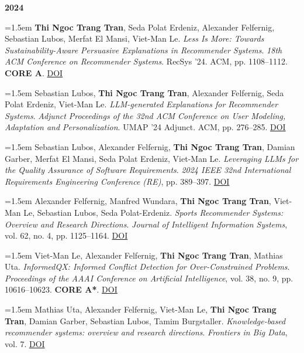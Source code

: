 \documentclass[11pt,a4paper]{article}
\newcommand{\pub}[1]{%
  \par\noindent\hangindent=1.5em\hangafter=1 #1\par\vspace{0.5ex}}
\newcommand{\pubyear}[1]{\vspace{0.7ex}\par\noindent\textbf{#1}\par\vspace{0.2ex}}
\begin{document}
\pubyear{2024}
\pub{\textbf{Thi Ngoc Trang Tran}, Seda Polat Erdeniz, Alexander Felfernig, Sebastian Lubos, Merfat El Mansi, Viet-Man Le. \textit{Less Is More: Towards Sustainability-Aware Persuasive Explanations in Recommender Systems}. \textit{18th ACM Conference on Recommender Systems}. RecSys ’24. ACM, pp. 1108–1112. \textbf{CORE A}. \href{https://doi.org/10.1145/3640457.3691708}{DOI}}
\pub{Sebastian Lubos, \textbf{Thi Ngoc Trang Tran}, Alexander Felfernig, Seda Polat Erdeniz, Viet-Man Le. \textit{LLM-generated Explanations for Recommender Systems}. \textit{Adjunct Proceedings of the 32nd ACM Conference on User Modeling, Adaptation and Personalization}. UMAP ’24 Adjunct. ACM, pp. 276–285. \href{https://doi.org/10.1145/3631700.3665185}{DOI}}
\pub{Sebastian Lubos, Alexander Felfernig, \textbf{Thi Ngoc Trang Tran}, Damian Garber, Merfat El Mansi, Seda Polat Erdeniz, Viet-Man Le. \textit{Leveraging LLMs for the Quality Assurance of Software Requirements}. \textit{2024 IEEE 32nd International Requirements Engineering Conference (RE)}, pp. 389–397. \href{https://doi.org/10.1109/re59067.2024.00046}{DOI}}
\pub{Alexander Felfernig, Manfred Wundara, \textbf{Thi Ngoc Trang Tran}, Viet-Man Le, Sebastian Lubos, Seda Polat-Erdeniz. \textit{Sports Recommender Systems: Overview and Research Directions}. \textit{Journal of Intelligent Information Systems}, vol. 62, no. 4, pp. 1125–1164. \href{https://doi.org/10.1007/s10844-024-00857-w}{DOI}}
\pub{Viet-Man Le, Alexander Felfernig, \textbf{Thi Ngoc Trang Tran}, Mathias Uta. \textit{InformedQX: Informed Conflict Detection for Over-Constrained Problems}. \textit{Proceedings of the AAAI Conference on Artificial Intelligence}, vol. 38, no. 9, pp. 10616–10623. \textbf{CORE A*}. \href{https://doi.org/10.1609/aaai.v38i9.28932}{DOI}}
\pub{Mathias Uta, Alexander Felfernig, Viet-Man Le, \textbf{Thi Ngoc Trang Tran}, Damian Garber, Sebastian Lubos, Tamim Burgstaller. \textit{Knowledge-based recommender systems: overview and research directions}. \textit{Frontiers in Big Data}, vol. 7. \href{https://doi.org/10.3389/fdata.2024.1304439}{DOI}}
\end{document}
